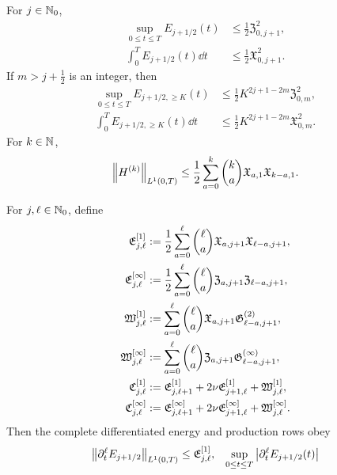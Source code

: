 {\begin{theorem}
For \(j\in\mathbb N_0\),
\begin{align}
 \sup_{0\le t\le T}E_{j+1/2}(t)
 &\le\frac12\mathfrak Z_{0,j+1}^2,
 \label{f:eq:qc-sharp-critical-sup}\\
 \int_0^TE_{j+1/2}(t)\dd t
 &\le\frac12\mathfrak X_{0,j+1}^2.
 \label{f:eq:qc-sharp-critical-mass}
\end{align}
If \(m>j+\frac12\) is an integer, then
\begin{align}
 \sup_{0\le t\le T}E_{j+1/2,\ge K}(t)
 &\le\frac12K^{2j+1-2m}\mathfrak Z_{0,m}^2,
 \label{f:eq:qc-sharp-critical-tail-sup}\\
 \int_0^TE_{j+1/2,\ge K}(t)\dd t
 &\le\frac12K^{2j+1-2m}\mathfrak X_{0,m}^2.
 \label{f:eq:qc-sharp-critical-tail-mass}
\end{align}
For \(k\in\mathbb N\),
\begin{equation}
 \left\lVert H^{(k)}\right\rVert_{L^1(0,T)}
 \le\frac12\sum_{a=0}^{k}\binom ka
 \mathfrak X_{a,1}\mathfrak X_{k-a,1}.
 \label{f:eq:qc-sharp-height-derivatives}
\end{equation}
\begin{samepage}
For \(j,\ell\in\mathbb N_0\), define
\begin{align}
 \mathfrak E_{j,\ell}^{[1]}
 &:=\frac12\sum_{a=0}^{\ell}\binom\ell a
 \mathfrak X_{a,j+1}\mathfrak X_{\ell-a,j+1},
 \notag\\
 \mathfrak E_{j,\ell}^{[\infty]}
 &:=\frac12\sum_{a=0}^{\ell}\binom\ell a
 \mathfrak Z_{a,j+1}\mathfrak Z_{\ell-a,j+1},
 \label{f:eq:qc-height-row-majorants}\\
 \mathfrak W_{j,\ell}^{[1]}
 &:=\sum_{a=0}^{\ell}\binom\ell a
 \mathfrak X_{a,j+1}\mathfrak G^{(2)}_{\ell-a,j+1},
 \notag\\
 \mathfrak W_{j,\ell}^{[\infty]}
 &:=\sum_{a=0}^{\ell}\binom\ell a
 \mathfrak Z_{a,j+1}\mathfrak G^{(\infty)}_{\ell-a,j+1},
 \label{f:eq:qc-force-work-row-majorants}\\
 \mathfrak C_{j,\ell}^{[1]}
 &:=\mathfrak E_{j,\ell+1}^{[1]}
    +2\nu\mathfrak E_{j+1,\ell}^{[1]}
    +\mathfrak W_{j,\ell}^{[1]},
 \notag\\
 \mathfrak C_{j,\ell}^{[\infty]}
 &:=\mathfrak E_{j,\ell+1}^{[\infty]}
    +2\nu\mathfrak E_{j+1,\ell}^{[\infty]}
    +\mathfrak W_{j,\ell}^{[\infty]}.
 \label{f:eq:qc-production-row-majorants}
\end{align}
Then the complete differentiated energy and production rows obey
\begin{align}
 \norm{\partial_t^\ell E_{j+1/2}}_{L^1(0,T)}
 &\le\mathfrak E_{j,\ell}^{[1]},
 &
 \sup_{0\le t\le T}
 \abs{\partial_t^\ell E_{j+1/2}(t)}

\end{align}
\end{samepage}
\end{theorem}}
